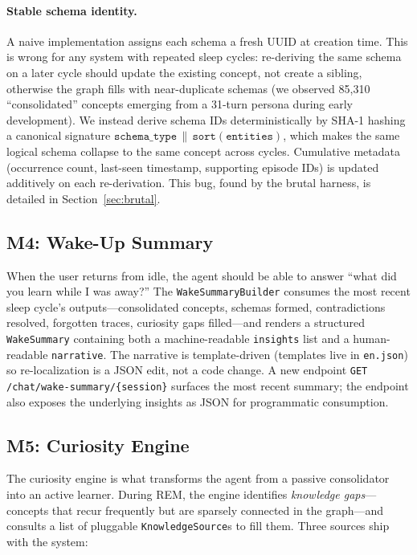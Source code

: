 \documentclass[11pt,twocolumn]{article}
\begin{document}
\paragraph{Stable schema identity.} A naive implementation assigns each schema a fresh UUID at creation time. This is wrong for any system with repeated sleep cycles: re-deriving the same schema on a later cycle should update the existing concept, not create a sibling, otherwise the graph fills with near-duplicate schemas (we observed 85{,}310 ``consolidated'' concepts emerging from a 31-turn persona during early development). We instead derive schema IDs deterministically by SHA-1 hashing a canonical signature \(\texttt{schema\_type} \,\|\, \texttt{sort}(\texttt{entities})\), which makes the same logical schema collapse to the same concept across cycles. Cumulative metadata (occurrence count, last-seen timestamp, supporting episode IDs) is updated additively on each re-derivation. This bug, found by the brutal harness, is detailed in Section~\ref{sec:brutal}.

\subsection{M4: Wake-Up Summary}

When the user returns from idle, the agent should be able to answer ``what did you learn while I was away?'' The \texttt{WakeSummaryBuilder} consumes the most recent sleep cycle's outputs---consolidated concepts, schemas formed, contradictions resolved, forgotten traces, curiosity gaps filled---and renders a structured \texttt{WakeSummary} containing both a machine-readable \texttt{insights} list and a human-readable \texttt{narrative}. The narrative is template-driven (templates live in \texttt{en.json}) so re-localization is a JSON edit, not a code change. A new endpoint \texttt{GET /chat/wake-summary/\{session\}} surfaces the most recent summary; the endpoint also exposes the underlying insights as JSON for programmatic consumption.

\subsection{M5: Curiosity Engine}

The curiosity engine is what transforms the agent from a passive consolidator into an active learner. During REM, the engine identifies \emph{knowledge gaps}---concepts that recur frequently but are sparsely connected in the graph---and consults a list of pluggable \texttt{KnowledgeSource}s to fill them. Three sources ship with the system:
\end{document}
